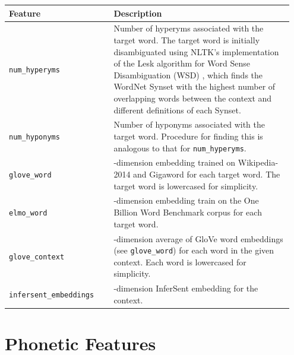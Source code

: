 \documentclass{dcthesis}
\theoremstyle{definition}
\theoremstyle{remark}
\begin{document}
\begin{table}[H]
  \centering
  \begin{tabular}{>{\centering\arraybackslash}p{0.35\linewidth}>{\arraybackslash}p{0.6\linewidth}}
    \hline \textbf{Feature} & \textbf{Description} \\ \hline  
    \texttt{num\_hyperyms} & Number of hyperyms associated with the target word. The target word is initially disambiguated using NLTK's implementation of the Lesk algorithm for Word Sense Disambiguation (WSD) \citep{10.1145318723.318728}, which finds the WordNet Synset with the highest number of overlapping words between the context and different definitions of each Synset.\\
    \hline 
    \texttt{num\_hyponyms} & Number of hyponyms associated with the target word. Procedure for finding this is analogous to that for \texttt{num\_hyperyms}.\\
    \hline 
    \texttt{glove\_word} & 300-dimension embedding trained on Wikipedia-2014 and Gigaword for each target word. The target word is lowercased for simplicity.\\
    \hline 
    \texttt{elmo\_word} & 1024-dimension embedding train on the One Billion Word Benchmark corpus for each target word.\\
    \hline 
    \texttt{glove\_context} & 300-dimension average of GloVe word embeddings (see \texttt{glove\_word}) for each word in the given context. Each word is lowercased for simplicity.\\
    \hline 
    \texttt{infersent\_embeddings} & 4096-dimension InferSent embedding for the context.\\
    \hline 
  \end{tabular}
  \label{semantic_features}
\end{table}

\section{Phonetic Features}
\end{document}
